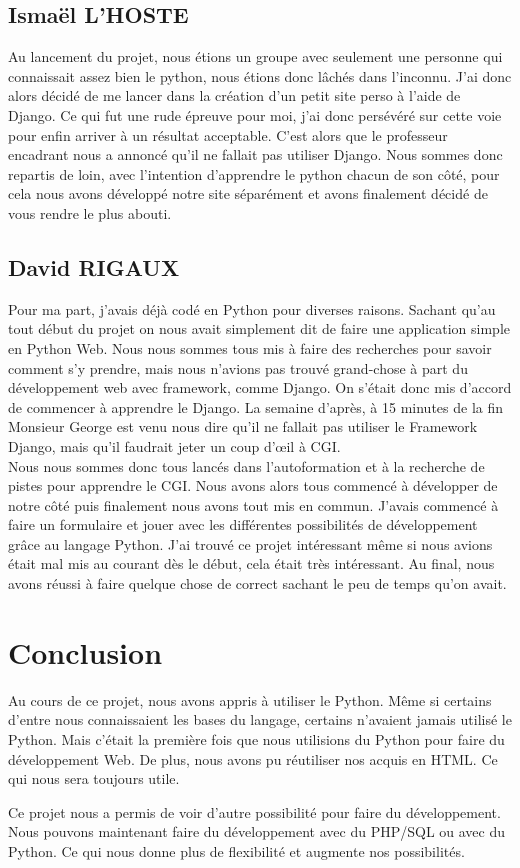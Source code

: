 \documentclass[12pt]{article}
\begin{document}
\subsection{Ismaël L'HOSTE}
Au lancement du projet, nous étions un groupe avec seulement une personne qui connaissait assez bien le python, nous étions donc lâchés dans l’inconnu. J’ai donc alors décidé de me lancer dans la création d’un petit site perso à l’aide de Django. Ce qui fut une rude épreuve pour moi, j’ai donc persévéré sur cette voie pour enfin arriver à un résultat acceptable. C’est alors que le professeur encadrant nous a annoncé qu’il ne fallait pas utiliser Django. Nous sommes donc repartis de loin, avec l’intention d’apprendre le python chacun de son côté, pour cela nous avons développé notre site séparément et avons finalement décidé de vous rendre le plus abouti.
\subsection{David RIGAUX}
Pour ma part, j'avais déjà codé en Python pour diverses raisons. Sachant qu'au tout début du projet on nous avait simplement dit de faire une application simple en Python Web. Nous nous sommes tous mis à faire des recherches pour savoir comment s'y prendre, mais nous n'avions pas trouvé grand-chose à part du développement web avec framework, comme Django. On s'était donc mis d'accord de commencer à apprendre le Django. La semaine d'après, à 15 minutes de la fin Monsieur George est venu nous dire qu'il ne fallait pas utiliser le Framework Django, mais qu'il faudrait jeter un coup d'œil à CGI. \\
Nous nous sommes donc tous lancés dans l'autoformation et à la recherche de pistes pour apprendre le CGI. Nous avons alors tous commencé à développer de notre côté puis finalement nous avons tout mis en commun. J'avais commencé à faire un formulaire et jouer avec les différentes possibilités de développement grâce au langage Python. J'ai trouvé ce projet intéressant même si nous avions était mal mis au courant dès le début, cela était très intéressant. Au final, nous avons réussi à faire quelque chose de correct sachant le peu de temps qu'on avait. 
\section{Conclusion}

Au cours de ce projet, nous avons appris à utiliser le Python. Même si certains d'entre nous connaissaient les bases du langage, certains n'avaient jamais utilisé le Python. Mais c'était la première fois que nous utilisions du Python pour faire du développement Web. 
De plus, nous avons pu réutiliser nos acquis en HTML. Ce qui nous sera toujours utile.

Ce projet nous a permis de voir d'autre possibilité pour faire du développement. Nous pouvons maintenant faire du développement avec du PHP/SQL ou avec du Python. Ce qui nous donne plus de flexibilité et augmente nos possibilités.
\end{document}
